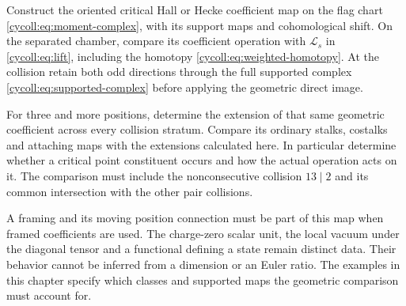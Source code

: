 \begin{problem}\label{cycoll:prob:hall-comparison}
Construct the oriented critical Hall or Hecke coefficient
map on the flag chart \eqref{cycoll:eq:moment-complex},
with its support maps and cohomological shift.
On the separated chamber, compare its coefficient
operation with $\mathcal L_s$ in \eqref{cycoll:eq:lift},
including the homotopy \eqref{cycoll:eq:weighted-homotopy}.
At the collision retain both odd directions through
the full supported complex
\eqref{cycoll:eq:supported-complex} before applying
the geometric direct image.

For three and more positions, determine the extension
of that same geometric coefficient across every collision
stratum. Compare its ordinary stalks, costalks and
attaching maps with the extensions calculated here.
In particular determine whether a critical point
constituent occurs and how the actual operation acts
on it. The comparison must include the nonconsecutive
collision $13\mid2$ and its common intersection with
the other pair collisions.
\end{problem}

A framing and its moving position connection must be
part of this map when framed coefficients are used.
The charge-zero scalar unit, the local vacuum under
the diagonal tensor and a functional defining a state
remain distinct data. Their behavior cannot be inferred
from a dimension or an Euler ratio. The examples in
this chapter specify which classes and supported maps
the geometric comparison must account for.
